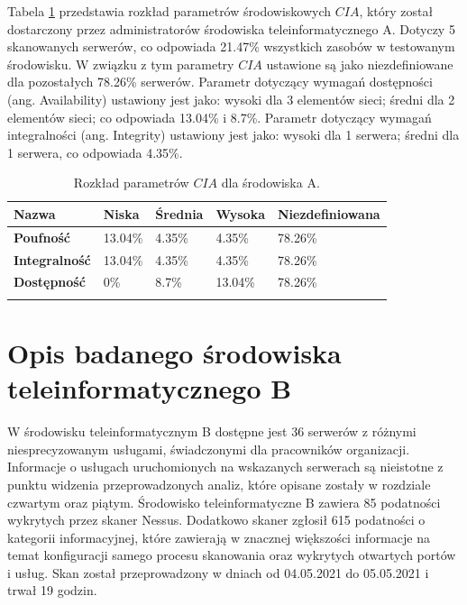 \bigbreak
Tabela \ref{tab:chapter5:env_a:cia} przedstawia rozkład parametrów środowiskowych $CIA$, który został dostarczony przez administratorów środowiska teleinformatycznego A. Dotyczy 5 skanowanych serwerów, co odpowiada 21.47\% wszystkich zasobów w testowanym środowisku. W związku z tym parametry $CIA$ ustawione są jako niezdefiniowane dla pozostałych 78.26\% serwerów. Parametr dotyczący wymagań dostępności (ang. Availability) ustawiony jest jako: wysoki dla 3 elementów sieci; średni dla 2 elementów sieci; co odpowiada 13.04\% i 8.7\%. Parametr dotyczący wymagań integralności (ang. Integrity) ustawiony jest jako: wysoki dla 1 serwera; średni dla 1 serwera, co odpowiada 4.35\%.

\begin{table}[tbh]
\caption{Rozkład parametrów $CIA$ dla środowiska A.}
\begin{center}
\label{tab:chapter5:env_a:cia}
\begin{tabular}{lllll}
\hline \noalign {\smallskip}
\textbf{Nazwa}           & Niska   & Średnia & Wysoka & Niezdefiniowana   \\
\hline \noalign {\smallskip}
\textbf{Poufność} &   13.04\%  &  4.35\%    & 4.35\%      &   78.26\% \\
\textbf{Integralność}       &   13.04\%  &  4.35\%    & 4.35\%      &   78.26\%  \\
\textbf{Dostępność}    &       0\%  &   8.7\%   & 13.04\%      &   78.26\%  \\
\hline \noalign {\smallskip}
\end{tabular}
\end{center}
\end{table}


\section{Opis badanego środowiska teleinformatycznego B}
\label{sec:desc_b}
W środowisku teleinformatycznym B dostępne jest 36 serwerów z różnymi niesprecyzowanym usługami, świadczonymi dla pracowników organizacji. Informacje o usługach uruchomionych na wskazanych serwerach są nieistotne z punktu widzenia przeprowadzonych analiz, które opisane zostały w rozdziale czwartym oraz piątym. Środowisko teleinformatyczne B zawiera 85 podatności wykrytych przez skaner Nessus. Dodatkowo skaner zgłosił 615 podatności o kategorii informacyjnej, które zawierają w znacznej większości informacje na temat konfiguracji samego procesu skanowania oraz wykrytych otwartych portów i usług. Skan został przeprowadzony w dniach od 04.05.2021 do 05.05.2021 i trwał 19 godzin.

